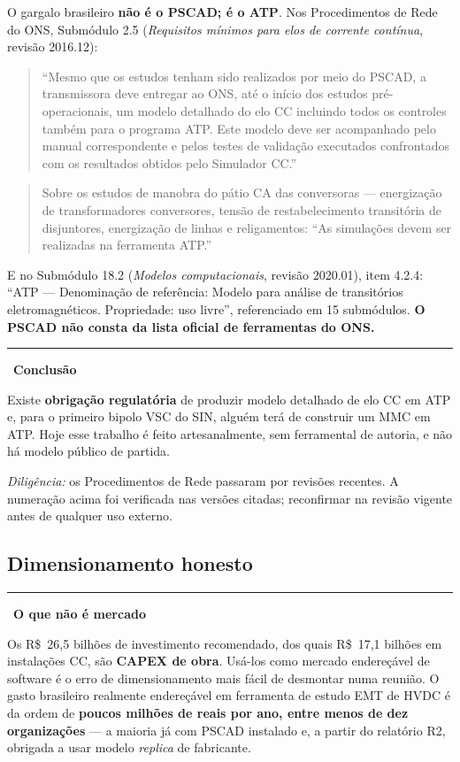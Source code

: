 \documentclass[12pt,a4paper]{article}
\newenvironment{citacao}
  {\begin{quote}\singlespacing\small\setlength{\leftskip}{2.5cm}\noindent}
  {\par\end{quote}}
\newcommand{\fonte}[1]{\par\vspace{2pt}\noindent{\footnotesize\textcolor{gray}{#1}}}
\newenvironment{destaque}[1]
  {\par\vspace{6pt}\begin{list}{}{%
     \setlength{\leftmargin}{0.8cm}\setlength{\rightmargin}{0cm}%
     \setlength{\labelwidth}{0pt}\setlength{\labelsep}{0pt}}%
   \item[]\textcolor{acento}{\rule[-1pt]{2pt}{10pt}}\ \textbf{#1}\par\vspace{2pt}\small}
  {\end{list}\vspace{6pt}}
\begin{document}
O gargalo brasileiro \textbf{não é o PSCAD; é o ATP}. Nos Procedimentos de Rede do ONS, Submódulo 2.5
(\emph{Requisitos mínimos para elos de corrente contínua}, revisão 2016.12):

\begin{citacao}
\enquote{Mesmo que os estudos tenham sido realizados por meio do PSCAD, a transmissora deve entregar
ao ONS, até o início dos estudos pré-operacionais, um modelo detalhado do elo CC incluindo todos os
controles também para o programa ATP. Este modelo deve ser acompanhado pelo manual correspondente e
pelos testes de validação executados confrontados com os resultados obtidos pelo Simulador CC.}
\fonte{ONS, Submódulo 2.5, \S7.15.1.10, p.~36.}
\end{citacao}

\begin{citacao}
Sobre os estudos de manobra do pátio CA das conversoras --- energização de transformadores
conversores, tensão de restabelecimento transitória de disjuntores, energização de linhas e
religamentos: \enquote{As simulações devem ser realizadas na ferramenta ATP.}
\fonte{ONS, Submódulo 2.5, \S7.15.3.4, p.~37.}
\end{citacao}

E no Submódulo 18.2 (\emph{Modelos computacionais}, revisão 2020.01), item 4.2.4: \enquote{ATP ---
Denominação de referência: Modelo para análise de transitórios eletromagnéticos. Propriedade: uso
livre}, referenciado em 15 submódulos. \textbf{O PSCAD não consta da lista oficial de ferramentas do
ONS.}

\begin{destaque}{Conclusão}
Existe \textbf{obrigação regulatória} de produzir modelo detalhado de elo CC em ATP e, para o
primeiro bipolo VSC do SIN, alguém terá de construir um MMC em ATP. Hoje esse trabalho é feito
artesanalmente, sem ferramental de autoria, e não há modelo público de partida.

\medskip
\emph{Diligência:} os Procedimentos de Rede passaram por revisões recentes. A numeração acima foi
verificada nas versões citadas; reconfirmar na revisão vigente antes de qualquer uso externo.
\end{destaque}

\subsection{Dimensionamento honesto}

\begin{destaque}{O que não é mercado}
Os R\$~26,5 bilhões de investimento recomendado, dos quais R\$~17,1 bilhões em instalações CC, são
\textbf{CAPEX de obra}. Usá-los como mercado endereçável de software é o erro de dimensionamento mais
fácil de desmontar numa reunião. O gasto brasileiro realmente endereçável em ferramenta de estudo EMT
de HVDC é da ordem de \textbf{poucos milhões de reais por ano, entre menos de dez organizações} ---
a maioria já com PSCAD instalado e, a partir do relatório R2, obrigada a usar modelo \emph{replica}
de fabricante.
\end{destaque}
\end{document}
